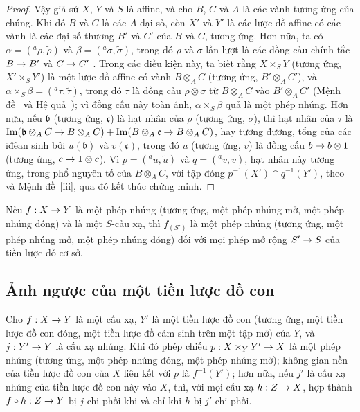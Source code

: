 \documentclass[oneside]{amsart}
\makeatletter
\newcommand{\ega@arrow}[2]{\mathchoice{#1}{#2}{#2}{#2}}
\let\ega@shortmapsto\mapsto
\renewcommand{\to}{\ega@arrow{\longrightarrow}{\rightarrow}}
\renewcommand{\mapsto}{\ega@arrow{\longmapsto}{\ega@shortmapsto}}
\let\EGAOriginalLabel\label
\renewcommand{\label}[1]{\phantomsection\EGAOriginalLabel{#1}}
\makeatother
\begin{document}
\begin{proof}
Vậy giả sử $X$, $Y$ và $S$ là affine, và cho $B$, $C$ và $A$ là các vành tương ứng của chúng.
Khi đó $B$ và $C$ là các $A$-đại số, còn $X'$ và $Y'$ là các lược đồ affine có các vành là các đại số thương $B'$ và $C'$ của $B$ và $C$, tương ứng.
Hơn nữa, ta có $\alpha=({}^a\rho,\widetilde{\rho})$ và $\beta=({}^a\sigma,\widetilde{\sigma})$, trong đó $\rho$ và $\sigma$ lần lượt là các đồng cấu chính tắc $B\to B'$ và $C\to C'$ .
Trong các điều kiện này, ta biết rằng $X\times_S Y$ (tương ứng, $X'\times_S Y'$) là một lược đồ affine có vành $B\otimes_A C$ (tương ứng, $B'\otimes_A C'$), và $\alpha\times_S\beta=({}^a\tau,\widetilde{\tau})$, trong đó $\tau$ là đồng cấu $\rho\otimes\sigma$ từ $B\otimes_A C$ vào $B'\otimes_A C'$ (Mệnh đề~ và Hệ quả~);
vì đồng cấu này toàn ánh, $\alpha\times_S\beta$ quả là một phép nhúng.
Hơn nữa, nếu $\mathfrak{b}$ (tương ứng, $\mathfrak{c}$) là hạt nhân của $\rho$ (tương ứng, $\sigma$), thì hạt nhân của $\tau$ là
$\operatorname{Im}(\mathfrak{b}\otimes_A C\to B\otimes_A C)+\operatorname{Im}(B\otimes_A\mathfrak{c}\to B\otimes_A C)$,
hay tương đương, tổng của các iđêan sinh bởi $u(\mathfrak{b})$ và $v(\mathfrak{c})$, trong đó $u$ (tương ứng, $v$) là đồng cấu $b\mapsto b\otimes 1$ (tương ứng, $c\mapsto 1\otimes c$).
Vì $p=({}^a u,\widetilde{u})$ và $q=({}^a v,\widetilde{v})$, hạt nhân này tương ứng, trong phổ nguyên tố của $B\otimes_A C$, với tập đóng $p^{-1}(X')\cap q^{-1}(Y')$, theo  và Mệnh đề~[iii], qua đó kết thúc chứng minh.
\end{proof}

\begin{corollary}[4.3.2]
\label{I.4.3.2}
Nếu $f:X\to Y$ là một phép nhúng (tương ứng, một phép nhúng mở, một phép nhúng đóng) và là một $S$-cấu xạ, thì $f_{(S')}$ là một phép nhúng (tương ứng, một phép nhúng mở, một phép nhúng đóng) đối với mọi phép mở rộng $S'\to S$ của tiền lược đồ cơ sở.
\end{corollary}

\subsection{Ảnh ngược của một tiền lược đồ con}
\label{subsection:I.4.4}

\begin{proposition}[4.4.1]
\label{I.4.4.1}
Cho $f:X\to Y$ là một cấu xạ, $Y'$ là một tiền lược đồ con (tương ứng, một tiền lược đồ con đóng, một tiền lược đồ cảm sinh trên một tập mở) của $Y$, và $j:Y'\to Y$ là cấu xạ nhúng.
Khi đó phép chiếu $p:X\times_Y Y'\to X$ là một phép nhúng (tương ứng, một phép nhúng đóng, một phép nhúng mở);
không gian nền của tiền lược đồ con của $X$ liên kết với $p$ là $f^{-1}(Y')$;
hơn nữa, nếu $j'$ là cấu xạ nhúng của tiền lược đồ con này vào $X$, thì, với mọi cấu xạ $h:Z\to X$, hợp thành $f\circ h:Z\to Y$ bị $j$ chi phối khi và chỉ khi $h$ bị $j'$ chi phối.
\end{proposition}
\end{document}
